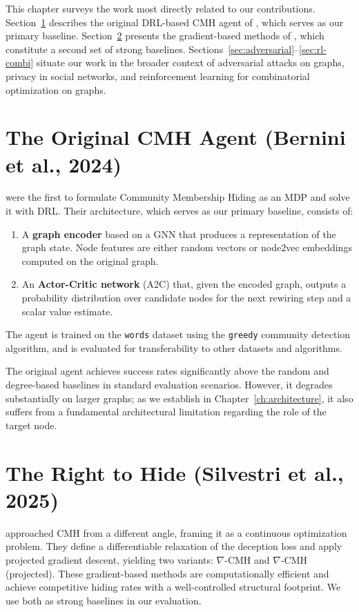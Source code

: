 \documentclass[11pt,a4paper,twoside]{tesis}
\begin{document}
This chapter surveys the work most directly related to our contributions.
Section~\ref{sec:bernini} describes the original DRL-based CMH agent of
\textcite{bernini-2024}, which serves as our primary baseline.
Section~\ref{sec:nabla} presents the gradient-based methods of
\textcite{silvestri2025righthidemaskingcommunity}, which constitute a second set of
strong baselines. Sections~\ref{sec:adversarial}--\ref{sec:rl-combi} situate our work
in the broader context of adversarial attacks on graphs, privacy in social networks,
and reinforcement learning for combinatorial optimization on graphs.

\section{The Original CMH Agent (Bernini et al., 2024)}
\label{sec:bernini}

\textcite{bernini-2024} were the first to formulate Community Membership Hiding as an
MDP and solve it with DRL. Their architecture, which serves as our primary baseline,
consists of:
\begin{enumerate}
    \item A \textbf{graph encoder} based on a GNN that produces a representation of the
          graph state. Node features are either random vectors or node2vec embeddings
          computed on the original graph.
    \item An \textbf{Actor-Critic network} (A2C) that, given the encoded graph, outputs
          a probability distribution over candidate nodes for the next rewiring step and a
          scalar value estimate.
\end{enumerate}
The agent is trained on the \texttt{words} dataset using the \texttt{greedy} community
detection algorithm, and is evaluated for transferability to other datasets and algorithms.

The original agent achieves success rates significantly above the random and
degree-based baselines in standard evaluation scenarios. However, it degrades
substantially on larger graphs; as we establish in
Chapter~\ref{ch:architecture}, it also suffers from a fundamental architectural limitation
regarding the role of the target node.

\section{The Right to Hide (Silvestri et al., 2025)}
\label{sec:nabla}

\textcite{silvestri2025righthidemaskingcommunity} approached CMH from a different angle,
framing it as a continuous optimization problem. They define a differentiable relaxation
of the deception loss and apply projected gradient descent, yielding two variants:
$\nabla$-CMH and $\nabla$-CMH (projected). These gradient-based methods are
computationally efficient and achieve competitive hiding rates with a well-controlled
structural footprint. We use both as strong baselines in our evaluation.
\end{document}
